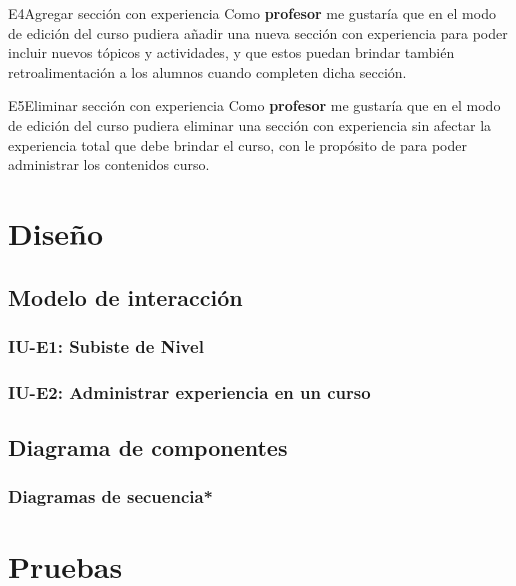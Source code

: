 \clearpage
    
    \begin{UserStory}{E4}{Agregar sección con experiencia}{%
        Como {\bf profesor} me gustaría que en el modo de edición del curso pudiera añadir una nueva sección con experiencia para poder incluir nuevos tópicos y actividades, y que estos puedan brindar también retroalimentación a los alumnos cuando completen dicha sección.
    }
    \end{UserStory}
    
    \begin{UserStory}{E5}{Eliminar sección con experiencia}{%
        Como {\bf profesor} me gustaría que en el modo de edición del curso pudiera eliminar una sección con experiencia sin afectar la experiencia total que debe brindar el curso, con le propósito de para poder administrar los contenidos curso.
    }
    \end{UserStory}

\chapter{Diseño}

\section{Modelo de interacción}
\subsection{IU-E1: Subiste de Nivel}
\subsection{IU-E2: Administrar experiencia en un curso}

\section{Diagrama de componentes}
\subsection{Diagramas de secuencia*}

\chapter{Pruebas}